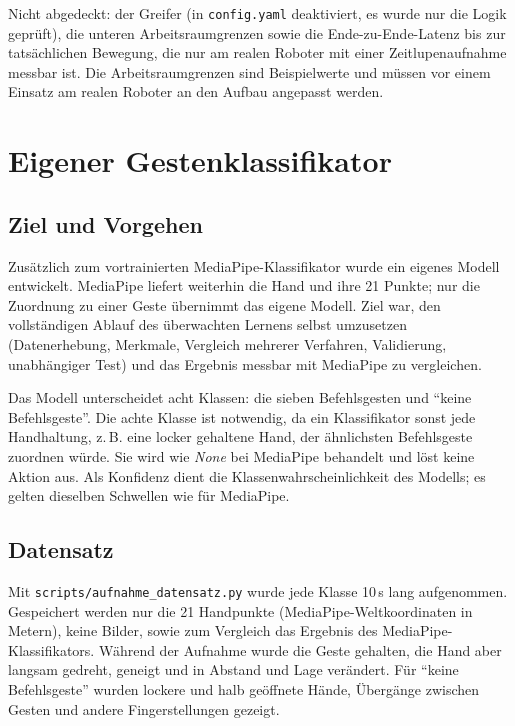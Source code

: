 \documentclass[11pt,a4paper]{article}
\newcommand{\datei}[1]{\texttt{#1}}
\begin{document}
Nicht abgedeckt: der Greifer (in \datei{config.yaml} deaktiviert, es wurde nur die Logik geprüft),
die unteren Arbeitsraumgrenzen sowie die Ende-zu-Ende-Latenz bis zur tatsächlichen Bewegung, die
nur am realen Roboter mit einer Zeitlupenaufnahme messbar ist. Die Arbeitsraumgrenzen sind
Beispielwerte und müssen vor einem Einsatz am realen Roboter an den Aufbau angepasst werden.

\section{Eigener Gestenklassifikator}
\label{sec:klassifikator}

\subsection{Ziel und Vorgehen}

Zusätzlich zum vortrainierten MediaPipe-Klassifikator wurde ein eigenes Modell entwickelt.
MediaPipe liefert weiterhin die Hand und ihre 21 Punkte; nur die Zuordnung zu einer Geste
übernimmt das eigene Modell. Ziel war, den vollständigen Ablauf des überwachten Lernens selbst
umzusetzen (Datenerhebung, Merkmale, Vergleich mehrerer Verfahren, Validierung, unabhängiger
Test) und das Ergebnis messbar mit MediaPipe zu vergleichen.

Das Modell unterscheidet acht Klassen: die sieben Befehlsgesten und \enquote{keine
Befehlsgeste}. Die achte Klasse ist notwendig, da ein Klassifikator sonst jede Handhaltung,
z.\,B. eine locker gehaltene Hand, der ähnlichsten Befehlsgeste zuordnen würde. Sie wird wie
\emph{None} bei MediaPipe behandelt und löst keine Aktion aus. Als Konfidenz dient die
Klassenwahrscheinlichkeit des Modells; es gelten dieselben Schwellen wie für MediaPipe.

\subsection{Datensatz}

Mit \datei{scripts/aufnahme\_datensatz.py} wurde jede Klasse 10\,s lang aufgenommen. Gespeichert
werden nur die 21 Handpunkte (MediaPipe-Weltkoordinaten in Metern), keine Bilder, sowie zum
Vergleich das Ergebnis des MediaPipe-Klassifikators. Während der Aufnahme wurde die Geste gehalten,
die Hand aber langsam gedreht, geneigt und in Abstand und Lage verändert. Für \enquote{keine
Befehlsgeste} wurden lockere und halb geöffnete Hände, Übergänge zwischen Gesten und andere
Fingerstellungen gezeigt.
\end{document}
